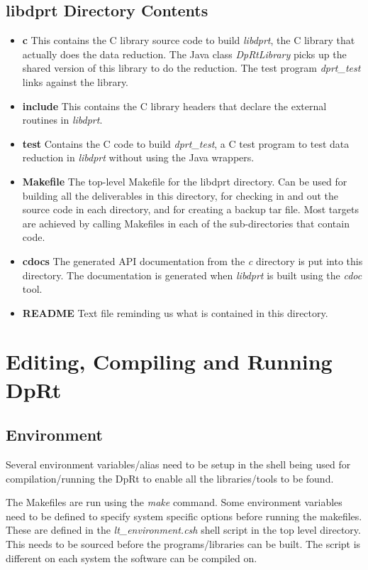 \documentclass[10pt,a4paper]{article}
\begin{document}
\subsection{libdprt Directory Contents}
\begin{itemize}
\item {\bf c} This contains the C library source code to build {\em libdprt}, the C library that actually does the
data reduction. The Java class {\em DpRtLibrary} picks up the shared version of this library to do the reduction.
The test program {\em dprt\_test} links against the library.
\item {\bf include} This contains the C library headers that declare the external routines in {\em libdprt}.
\item {\bf test} Contains the C code to build {\em dprt\_test}, a C test program to test data reduction in 
{\em libdprt} without using the Java wrappers.
\item {\bf Makefile} The top-level Makefile for the libdprt directory. Can be used for building all the
deliverables in this directory, for checking in  and out the source code in each directory, and for creating a 
backup tar file. Most targets are achieved by calling Makefiles in each of the sub-directories that contain code.
\item {\bf cdocs} The generated API documentation from the {\em c} directory is put into this directory. The
documentation is generated when {\em libdprt} is built using the {\em cdoc} tool.
\item {\bf README} Text file reminding us what is contained in this directory.
\end{itemize}

\section{Editing, Compiling and Running DpRt}
\subsection{Environment}
Several environment variables/alias need to be setup in the shell being used for compilation/running the
DpRt to enable all the libraries/tools to be found.

The Makefiles are run using the {\em make} command. Some environment variables need to be defined to specify
system specific options before running the makefiles. These are defined in the {\em lt\_environment.csh}
shell script in the top level directory. This needs to be sourced before the programs/libraries can be built.
The script is different on each system the software can be compiled on.
\end{document}
